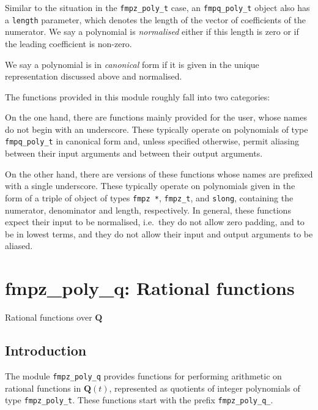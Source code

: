 \documentclass[a4paper,10pt]{book}
\newcommand{\Q}{\mathbf{Q}}%
\newcommand{\code}{\lstinline}
\begin{document}
{{Similar to the situation in the \code{fmpz_poly_t} case, an
\code{fmpq_poly_t} object also has a \code{length} parameter, which
denotes the length of the vector of coefficients of the numerator.
We say a polynomial is \emph{normalised} either if this length is zero
or if the leading coefficient is non-zero.

We say a polynomial is in \emph{canonical} form if it is given in the
unique representation discussed above and normalised.

The functions provided in this module roughly fall into two categories:

On the one hand, there are functions mainly provided for the user, whose
names do not begin with an underscore.  These typically operate on
polynomials of type \code{fmpq_poly_t} in canonical form and, unless
specified otherwise, permit aliasing between their input arguments and
between their output arguments.

On the other hand, there are versions of these functions whose names are
prefixed with a single underscore.  These typically operate on polynomials
given in the form of a triple of object of types \code{fmpz *},
\code{fmpz_t}, and \code{slong}, containing the numerator, denominator and
length, respectively.  In general, these functions expect their input to
be normalised, i.e.\ they do not allow zero padding, and to be in lowest
terms, and they do not allow their input and output arguments to be aliased.




\chapter{fmpz\_poly\_q: Rational functions}
\epigraph{Rational functions over $\Q$}{}

\section{Introduction}

The module \code{fmpz_poly_q} provides functions for performing
arithmetic on rational functions in $\mathbf{Q}(t)$, represented as
quotients of integer polynomials of type \code{fmpz_poly_t}.  These
functions start with the prefix \code{fmpz_poly_q_}.

}}
\end{document}
